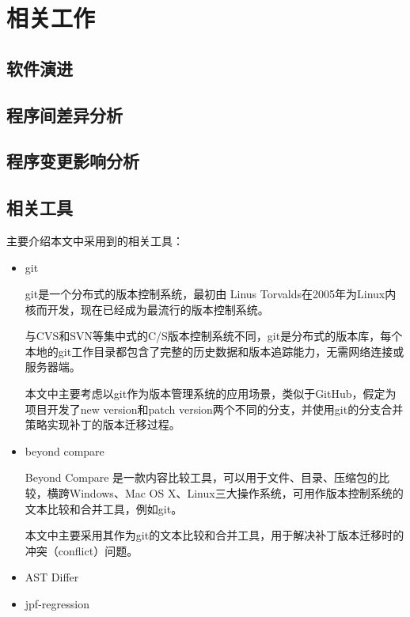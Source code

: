 \chapter{相关工作}
\section{软件演进}
\section{程序间差异分析}
\section{程序变更影响分析}
\section{相关工具}
	主要介绍本文中采用到的相关工具：
	
	\begin{itemize}
		\item git

git是一个分布式的版本控制系统，最初由 Linus Torvalds在2005年为Linux内核而开发，现在已经成为最流行的版本控制系统。

与CVS和SVN等集中式的C/S版本控制系统不同，git是分布式的版本库，每个本地的git工作目录都包含了完整的历史数据和版本追踪能力，无需网络连接或服务器端。
      

本文中主要考虑以git作为版本管理系统的应用场景，类似于GitHub，假定为项目开发了new version和patch version两个不同的分支，并使用git的分支合并策略实现补丁的版本迁移过程。
		\item beyond compare
		
Beyond Compare 是一款内容比较工具，可以用于文件、目录、压缩包的比较，横跨Windows、Mac OS X、Linux三大操作系统，可用作版本控制系统的文本比较和合并工具，例如git。
      
本文中主要采用其作为git的文本比较和合并工具，用于解决补丁版本迁移时的冲突（conflict）问题。

		\item AST Differ
		\item jpf-regression 

	\end{itemize}